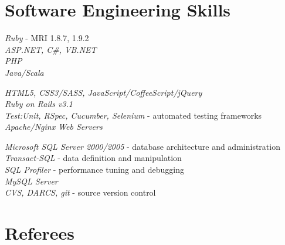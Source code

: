 \documentclass[10pt]{article} %
\begin{document}

\section{Software Engineering Skills}

{
\textit{Ruby} - MRI 1.8.7, 1.9.2\\
\textit{ASP.NET, C\#, VB.NET}\\
\textit{PHP}\\
\textit{Java/Scala}
}


{
\textit{HTML5, CSS3/SASS, JavaScript/CoffeeScript/jQuery}\\
\textit{Ruby on Rails v3.1}\\
\textit{Test:Unit, RSpec, Cucumber, Selenium} - automated testing frameworks\\
\textit{Apache/Nginx Web Servers}\\
}


{
\textit{Microsoft SQL Server 2000/2005} - database architecture and administration\\
\textit{Transact-SQL} - data definition and manipulation\\
\textit{SQL Profiler} - performance tuning and debugging\\
\textit{MySQL Server}\\
\textit{CVS, DARCS, git} - source version control
}




\section{Referees}
\end{document}
